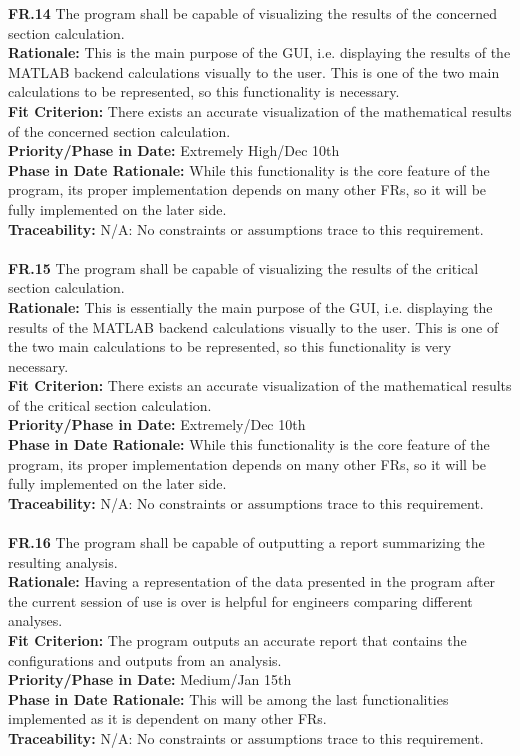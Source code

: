 \documentclass[12pt]{article}
\begin{document}
  \noindent\textbf{FR.14} The program shall be capable of visualizing the results of the concerned section calculation.\\
  \textbf{Rationale:} This is the main purpose of the GUI, i.e. displaying the results of the MATLAB backend calculations visually to the user. This is one of the two
  main calculations to be represented, so this functionality is necessary.\\
  \textbf{Fit Criterion:} There exists an accurate visualization of the mathematical results of the concerned section calculation.\\
  \textbf{Priority/Phase in Date:} Extremely High/Dec 10th\\
  \textbf{Phase in Date Rationale:} While this functionality is the core feature of the program, its proper implementation depends on many other FRs, so it will be fully implemented on the later side.\\
  \textbf{Traceability:} N/A: No constraints or assumptions trace to this requirement.\\\\

  \noindent\textbf{FR.15} The program shall be capable of visualizing the results of the critical section calculation.\\
  \textbf{Rationale:} This is essentially the main purpose of the GUI, i.e. displaying the results of the MATLAB backend calculations visually to the user. This is one of the two
  main calculations to be represented, so this functionality is very necessary.\\
  \textbf{Fit Criterion:} There exists an accurate visualization of the mathematical results of the critical section calculation.\\
  \textbf{Priority/Phase in Date:} Extremely/Dec 10th\\
  \textbf{Phase in Date Rationale:} While this functionality is the core feature of the program, its proper implementation depends on many other FRs, so it will be fully implemented on the later side.\\
  \textbf{Traceability:} N/A: No constraints or assumptions trace to this requirement.\\\\

  \noindent\textbf{FR.16} The program shall be capable of outputting a report summarizing the resulting analysis.\\
  \textbf{Rationale:} Having a representation of the data presented in the program after the current session of use is 
  over is helpful for engineers comparing different analyses.\\
  \textbf{Fit Criterion:} The program outputs an accurate report that contains the configurations and outputs from an analysis.\\
  \textbf{Priority/Phase in Date:} Medium/Jan 15th\\
  \textbf{Phase in Date Rationale:} This will be among the last functionalities implemented as it is dependent on many other FRs.\\
  \textbf{Traceability:} N/A: No constraints or assumptions trace to this requirement.\\\\
\end{document}
